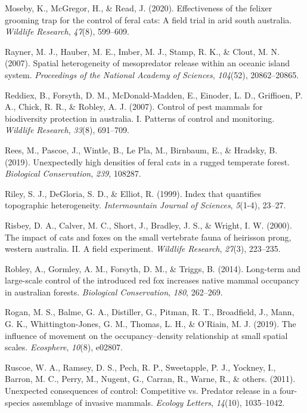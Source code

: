 \documentclass[]{elsarticle} %
\begin{document}
\leavevmode\hypertarget{ref-moseby2020effectiveness}{}%
Moseby, K., McGregor, H., \& Read, J. (2020). Effectiveness of the felixer grooming trap for the control of feral cats: A field trial in arid south australia. \emph{Wildlife Research}, \emph{47}(8), 599--609.

\leavevmode\hypertarget{ref-rayner2007}{}%
Rayner, M. J., Hauber, M. E., Imber, M. J., Stamp, R. K., \& Clout, M. N. (2007). Spatial heterogeneity of mesopredator release within an oceanic island system. \emph{Proceedings of the National Academy of Sciences}, \emph{104}(52), 20862--20865.

\leavevmode\hypertarget{ref-reddiex2007}{}%
Reddiex, B., Forsyth, D. M., McDonald-Madden, E., Einoder, L. D., Griffioen, P. A., Chick, R. R., \& Robley, A. J. (2007). Control of pest mammals for biodiversity protection in australia. I. Patterns of control and monitoring. \emph{Wildlife Research}, \emph{33}(8), 691--709.

\leavevmode\hypertarget{ref-rees2019}{}%
Rees, M., Pascoe, J., Wintle, B., Le Pla, M., Birnbaum, E., \& Hradsky, B. (2019). Unexpectedly high densities of feral cats in a rugged temperate forest. \emph{Biological Conservation}, \emph{239}, 108287.

\leavevmode\hypertarget{ref-riley1999}{}%
Riley, S. J., DeGloria, S. D., \& Elliot, R. (1999). Index that quantifies topographic heterogeneity. \emph{Intermountain Journal of Sciences}, \emph{5}(1-4), 23--27.

\leavevmode\hypertarget{ref-risbey2000}{}%
Risbey, D. A., Calver, M. C., Short, J., Bradley, J. S., \& Wright, I. W. (2000). The impact of cats and foxes on the small vertebrate fauna of heirisson prong, western australia. II. A field experiment. \emph{Wildlife Research}, \emph{27}(3), 223--235.

\leavevmode\hypertarget{ref-robley2014}{}%
Robley, A., Gormley, A. M., Forsyth, D. M., \& Triggs, B. (2014). Long-term and large-scale control of the introduced red fox increases native mammal occupancy in australian forests. \emph{Biological Conservation}, \emph{180}, 262--269.

\leavevmode\hypertarget{ref-rogan2019}{}%
Rogan, M. S., Balme, G. A., Distiller, G., Pitman, R. T., Broadfield, J., Mann, G. K., Whittington-Jones, G. M., Thomas, L. H., \& O'Riain, M. J. (2019). The influence of movement on the occupancy--density relationship at small spatial scales. \emph{Ecosphere}, \emph{10}(8), e02807.

\leavevmode\hypertarget{ref-ruscoe2011}{}%
Ruscoe, W. A., Ramsey, D. S., Pech, R. P., Sweetapple, P. J., Yockney, I., Barron, M. C., Perry, M., Nugent, G., Carran, R., Warne, R., \& others. (2011). Unexpected consequences of control: Competitive vs. Predator release in a four-species assemblage of invasive mammals. \emph{Ecology Letters}, \emph{14}(10), 1035--1042.
\end{document}
